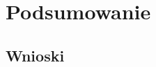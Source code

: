 \documentclass[twoside,a4paper]{report}
\begin{document}
\chapter{Podsumowanie}
\section{Wnioski}


\listoffigures
\lstlistoflistings

\printbibliography
% 
% 

\end{document}
